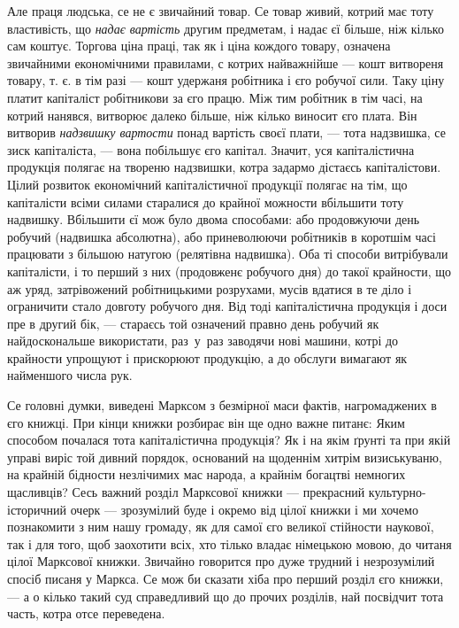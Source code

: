 Але праця людська, се не є звичайний товар. Се товар живий, котрий має тоту властивість, що \emph{надає вартість} другим предметам, і надає єї більше, ніж кілько сам коштує. Торгова ціна праці, так як і ціна кождого товару, означена звичайними економічними правилами, с котрих найважнійше — кошт витвореня товару, т. є. в тім разі — кошт удержаня робітника і єго робучої сили. Таку ціну платит капіталіст робітникови за єго працю. Між тим робітник в тім часі, на котрий нанявся, витворює далеко більше, ніж кілько виносит єго плата. Він витворив \emph{надзвишку вартости} понад вартість своєї плати, — тота надзвишка, се зиск капіталіста, — вона побільшує єго капітал. Значит, уся капіталістична продукція полягає на твореню надзвишки, котра задармо дістаєсь капіталістови. Цілий розвиток економічний капіталістичної продукції полягає на тім, що капіталісти всіми силами старалися до крайної можности вбільшити тоту надвишку. Вбільшити єї мож було двома способами: або продовжуючи день робучий (надвишка абсолютна), або приневолюючи робітників в коротшім часі працювати з більшою натугою (релятівна надвишка). Оба ті способи витрібували капіталісти, і то перший з них (продовженє робучого дня) до такої крайности, що аж уряд, затрівожений робітницькими розрухами, мусів вдатися в те діло і ограничити стало довготу робучого дня. Від тоді капіталістична продукція і доси пре в другий бік, — стараєсь той означений правно день робучий як найдоскональше використати, раз~у~раз заводячи нові машини, котрі до крайности упрощуют і прискорюют продукцію, а до обслуги вимагают як найменшого числа рук.

Се головні думки, виведені Марксом з безмірної маси фактів, нагромаджених в єго книжці. При кінци книжки розбирає він ще одно важне питанє: Яким способом почалася тота капіталістична продукція? Як і на якім ґрунті та при якій управі виріс той дивний порядок, оснований на щоденнім хитрім визиськуваню, на крайній бідности незлічимих мас народа, а крайнім богацтві немногих щасливців? Сесь важний розділ Марксової книжки — прекрасний культурно-історичний очерк — зрозумілий буде і окремо від цілої книжки і ми хочемо познакомити з ним нашу громаду, як для самої єго великої стійности наукової, так і для того, щоб заохотити всіх, хто тілько владає німецькою мовою, до читаня цілої Марксової книжки. Звичайно говорится про дуже трудний і незрозумілий спосіб писаня у Маркса. Се мож би сказати хіба про перший розділ єго книжки, — а о кілько такий суд справедливий що до прочих розділів, най посвідчит тота часть, котра отсе переведена.
